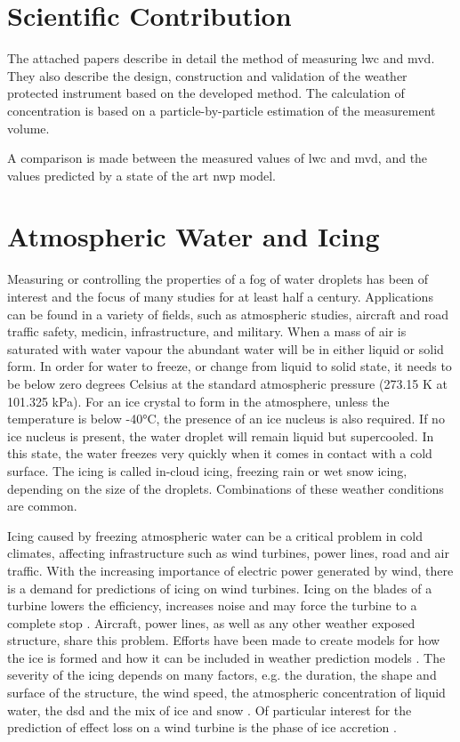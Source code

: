 \section{Scientific Contribution}

The attached papers describe in detail the method of measuring \gls{lwc} and \gls{mvd}. They also describe the design, construction and validation of the weather protected instrument based on the developed method. The calculation of concentration is based on a particle-by-particle estimation of the measurement volume. 

A comparison is made between the measured values of \gls{lwc} and \gls{mvd}, and the values predicted by a state of the art \gls{nwp} model.

\section{Atmospheric Water and Icing}

Measuring or controlling the properties of a fog of water droplets has been of interest and the focus of many studies for at least half a century. Applications can be found in a variety of fields, such as atmospheric studies, aircraft and road traffic safety, medicin, infrastructure, and military. When a mass of air is saturated with water vapour the abundant water will be in either liquid or solid form. In order for water to freeze, or change from liquid to solid state, it needs to be below zero degrees Celsius at the standard atmospheric pressure (273.15 K at 101.325 kPa). For an ice crystal to form in the atmosphere, unless the temperature is below -40°C, the presence of an ice nucleus is also required. If no ice nucleus is present, the water droplet will remain liquid but supercooled. In this state, the water freezes very quickly when it comes in contact with a cold surface. The icing is called in-cloud icing, freezing rain or wet snow icing, depending on the size of the droplets. Combinations of these weather conditions are common.

Icing caused by freezing atmospheric water can be a critical problem in cold climates, affecting infrastructure such as wind turbines, power lines, road and air traffic. With the increasing importance of electric power generated by wind, there is a demand for predictions of icing on wind turbines. Icing on the blades of a turbine lowers the efficiency, increases noise and may force the turbine to a complete stop \cite{dalili2009,cost727,homo2012,jasin1998}. Aircraft, power lines, as well as any other weather exposed structure, share this problem. Efforts have been made to create models for how the ice is formed \cite{makk2000,makk2001,shin1992} and how it can be included in weather prediction models \cite{thomp2009,kring2011}. The severity of the icing depends on many factors, e.g. the duration, the shape and surface of the structure, the wind speed, the atmospheric concentration of liquid water, the \gls{dsd} and the mix of ice and snow \cite{kring2011,makk2000,makk2001,homo2010,han2012}. Of particular interest for the prediction of effect loss on a wind turbine is the phase of ice accretion \cite{davis2014}.

